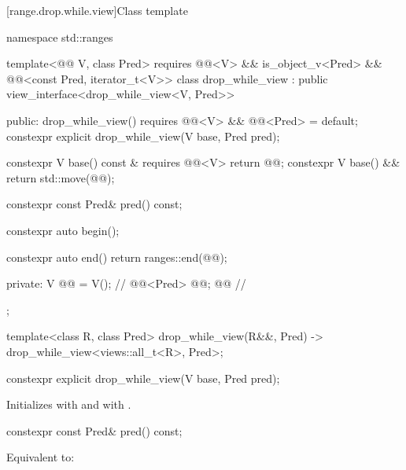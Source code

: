 [range.drop.while.view]{Class template }

%
%
%
\begin{codeblock}
namespace std::ranges {
  template<@@ V, class Pred>
    requires @@<V> && is_object_v<Pred> &&
             @@<const Pred, iterator_t<V>>
  class drop_while_view : public view_interface<drop_while_view<V, Pred>> {
  public:
    drop_while_view() requires @@<V> && @@<Pred> = default;
    constexpr explicit drop_while_view(V base, Pred pred);

    constexpr V base() const & requires @@<V> { return @@; }
    constexpr V base() && { return std::move(@@); }

    constexpr const Pred& pred() const;

    constexpr auto begin();

    constexpr auto end() { return ranges::end(@@); }

  private:
    V @@ = V();                                      // \expos
    @@<Pred> @@; @\itcorr[-1]@                           // \expos
  };

  template<class R, class Pred>
    drop_while_view(R&&, Pred) -> drop_while_view<views::all_t<R>, Pred>;
}
\end{codeblock}

%
\begin{itemdecl}
constexpr explicit drop_while_view(V base, Pred pred);
\end{itemdecl}

\begin{itemdescr}
\pnum
\effects
Initializes  with  and
 with .
\end{itemdescr}

%
\begin{itemdecl}
constexpr const Pred& pred() const;
\end{itemdecl}

\begin{itemdescr}
\pnum
\effects
Equivalent to: 
\end{itemdescr}


